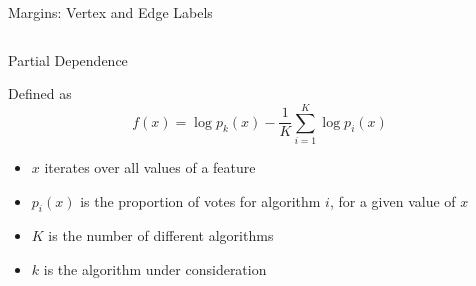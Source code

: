 \documentclass{beamer}
\begin{document}
\begin{frame}{Margins: Vertex and Edge Labels}
\begin{columns}[t]
\begin{column}{0.5\textwidth}
    \end{column}
  \end{columns}
\end{frame}

\begin{frame}{Partial Dependence}
  \begin{block}{Defined as}
    \[ f(x) = \log{p_k(x)} - \frac{1}{K} \sum_{i=1}^K \log{p_i(x)} \]
    \begin{itemize}
    \item $x$ iterates over all values of a feature
    \item $p_i(x)$ is the proportion of votes for algorithm $i$, for a given
      value of $x$
    \item $K$ is the number of different algorithms
    \item $k$ is the algorithm under consideration
    \end{itemize}
  \end{block}
\end{frame}
\end{document}
